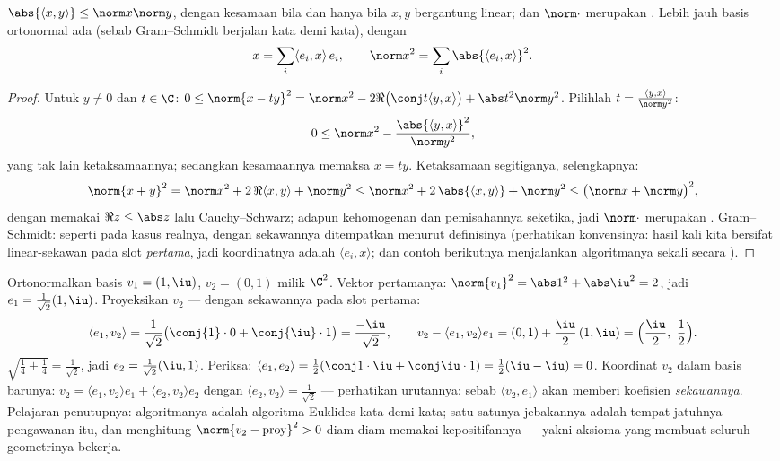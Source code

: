 \begin{theorem}\label{thm:b2:hermitian:cs}
$\abs{\langle x, y\rangle} \leq \norm x \norm y$, dengan kesamaan bila dan
hanya bila $x, y$ bergantung linear; dan $\norm\cdot$ merupakan . Lebih
jauh basis ortonormal ada (sebab Gram--Schmidt berjalan kata demi kata), dengan
\[
x = \sum_i \langle e_i, x\rangle\, e_i,
\qquad
\norm x^2 = \sum_i \abs{\langle e_i, x\rangle}^2 .
\]
\end{theorem}

\begin{proof}
Untuk $y \neq 0$ dan $t \in \C$: $0 \leq \norm{x - ty}^2 = \norm x^2
- 2\Re\bigl(\conj t\langle y, x\rangle\bigr) + \abs t^2\norm y^2$.
Pilihlah $t = \frac{\langle y, x\rangle}{\norm y^2}$:
\[
0 \leq \norm x^2 - \frac{\abs{\langle y, x\rangle}^2}{\norm y^2},
\]
yang tak lain ketaksamaannya; sedangkan kesamaannya memaksa $x = ty$.
Ketaksamaan segitiganya, selengkapnya:
\[
\norm{x + y}^2 = \norm x^2 + 2\,\Re\langle x, y\rangle
+ \norm y^2
\leq \norm x^2 + 2\,\abs{\langle x, y\rangle} + \norm y^2
\leq \bigl(\norm x + \norm y\bigr)^2 ,
\]
dengan memakai $\Re z \leq \abs z$ lalu Cauchy--Schwarz; adapun kehomogenan
dan pemisahannya seketika, jadi $\norm\cdot$ merupakan .
Gram--Schmidt: seperti pada kasus realnya, dengan sekawannya
ditempatkan menurut definisinya (perhatikan konvensinya: hasil kali kita
bersifat linear-sekawan pada slot \emph{pertama}, jadi koordinatnya adalah
$\langle e_i, x\rangle$; dan contoh berikutnya menjalankan algoritmanya
sekali secara ).
\end{proof}

\begin{example}\label{ex:b2:hermitian:gramschmidt}
Ortonormalkan basis $v_1 = (1, \iu)$, $v_2 = (0, 1)$ milik
$\C^2$. Vektor pertamanya: $\norm{v_1}^2 = \abs1^2 + \abs\iu^2 = 2$,
jadi $e_1 = \frac{1}{\sqrt2}(1, \iu)$. Proyeksikan $v_2$ --- dengan
sekawannya pada slot pertama:
\[
\langle e_1, v_2\rangle
= \frac{1}{\sqrt2}\bigl(\conj{1}\cdot0 +
\conj{\iu}\cdot1\bigr)
= \frac{-\iu}{\sqrt2} ,
\qquad
v_2 - \langle e_1, v_2\rangle e_1
= (0,1) + \frac{\iu}{2}\,(1, \iu)
= \Bigl(\frac\iu2,\ \frac12\Bigr) .
\]
 $\sqrt{\frac14 + \frac14} = \frac{1}{\sqrt2}$, jadi
$e_2 = \frac{1}{\sqrt2}(\iu, 1)$. Periksa: $\langle e_1,
e_2\rangle = \frac12(\conj1\cdot\iu + \conj\iu\cdot1) =
\frac12(\iu - \iu) = 0$. Koordinat $v_2$ dalam basis barunya:
$v_2 = \langle e_1, v_2\rangle e_1 + \langle e_2, v_2\rangle
e_2$ dengan $\langle e_2, v_2\rangle = \frac{1}{\sqrt2}$ ---
perhatikan urutannya: sebab $\langle v_2, e_1\rangle$ akan memberi
koefisien \emph{sekawannya}. Pelajaran penutupnya: algoritmanya adalah
algoritma Euklides kata demi kata; satu-satunya jebakannya adalah tempat
jatuhnya pengawanan itu, dan menghitung $\norm{v_2 -
\text{proy}}^2 > 0$ diam-diam memakai kepositifannya --- yakni aksioma
yang membuat seluruh geometrinya bekerja.
\end{example}

